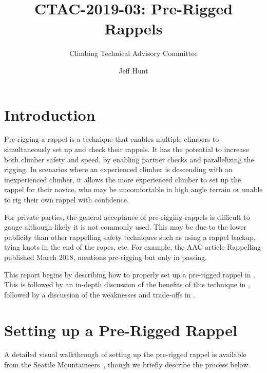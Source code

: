 \documentclass[nonacm,acmtog]{acmart}
\title{CTAC-2019-03: Pre-Rigged Rappels}
\subtitle{Climbing Technical Advisory Committee}
\author{Jeff Hunt}
\begin{document}
\maketitle

\section{Introduction}
\label{sec:intro}

  Pre-rigging a rappel is a technique that enables multiple climbers to
  simultaneously set up and check their rappels.  It has the potential to
  increase both climber safety and speed, by enabling partner checks and
  parallelizing the rigging.  In scenarios where an experienced climber is
  descending with an inexperienced climber, it allows the more experienced
  climber to set up the rappel for their novice, who may be uncomfortable in
  high angle terrain or unable to rig their own rappel with confidence.

  For private parties, the general acceptance of pre-rigging rappels is
  difficult to gauge although likely it is not commonly used.  This may be due
  to the lower publicity than other rappelling safety techniques such as using
  a rappel backup, tying knots in the end of the ropes, etc.  For example, the
  AAC article Rappelling published March 2018, mentions pre-rigging but only in
  passing.

  This report begins by describing how to properly set up a pre-rigged rappel
  in . This is followed by an in-depth discussion of the
  benefits of this technique in , followed by a discussion
  of the weaknesses and trade-offs in .

\section{Setting up a Pre-Rigged Rappel}
\label{sec:setup}

  A detailed visual walkthrough of setting up the pre-rigged rappel is
  available from the Seattle Mountaineers~\cite[time
  4:55]{mountaineers:rappel-video}, though we briefly describe the process
  below.
\end{document}
